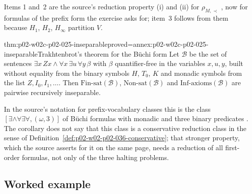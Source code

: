 Items 1 and~2 are the source's reduction property (i) and (ii) for
\(\rho_{M,\prec}\) \cite[Sect.~2.1.2, p.~34]{BorgerGradelGurevich1997}, now for
formulas of the prefix form the exercise asks for; item~3 follows from them
because \(H_1\), \(H_2\), \(H_\infty\) partition \(V\).

\begin{hbcorollary}{thm:p02-w02c-p02-025-inseparable}{proved=annex:p02-w02c-p02-025-inseparable}{Trakhtenbrot's theorem for the B\"uchi form}
Let \(\mathcal B\) be the set of sentences
\(\exists x\,Zx\land\forall x\,\exists u\,\forall y\,\beta\) with \(\beta\)
quantifier-free in the variables \(x,u,y\), built without equality from the
binary symbols \(H\), \(T_0\), \(K\) and monadic symbols from the list
\(Z,I_0,I_1,\ldots\).  Then \(\mathrm{Fin\text{-}sat}(\mathcal B)\),
\(\mathrm{Non\text{-}sat}(\mathcal B)\) and
\(\mathrm{Inf\text{-}axioms}(\mathcal B)\) are pairwise recursively
inseparable.
\end{hbcorollary}

In the source's notation for prefix-vocabulary classes this is the class
\([\exists\land\forall\exists\forall,(\omega,3)]\) of B\"uchi formulas with
monadic and three binary predicates
\cite[Sect.~3.2, p.~115]{BorgerGradelGurevich1997}.  The corollary does not
say that this class is a conservative reduction class in the sense of
Definition~\ref{def:p02-w02-p02-036-conservative}; that stronger property,
which the source asserts for it on the same page, needs a reduction of all
first-order formulas, not only of the three halting problems.

\subsection{Worked example}
\label{sec:p02-w02c-p02-025-example}

